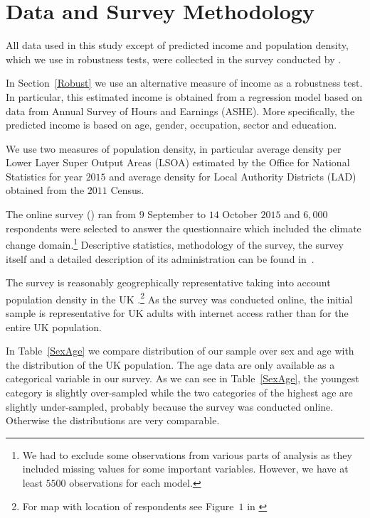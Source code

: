 \documentclass[a4paper,12pt]{article}
\begin{document}
\FloatBarrier
\section{Data and Survey Methodology}\label{Data}
All data used in this study except of predicted income and population density, which we use in robustness tests,  were collected in the survey conducted by \cite{SurveyUK}. 



In Section~\ref{Robust} we use an alternative measure of income as a robustness test. In particular, this estimated income is obtained from a regression model based on data from Annual Survey of Hours and Earnings (ASHE). More specifically, the predicted income is based on age, gender, occupation, sector and education.


We use two measures of population density, in particular average density per Lower Layer Super Output Areas (LSOA) estimated by the Office for National Statistics for year $2015$ and average density for Local Authority Districts (LAD) obtained from the $2011$ Census.




The online survey (\citealp{SurveyUK}) ran from $9$ September to $14$
October $2015$ and $6,000$ respondents were selected to answer the questionnaire which included the climate change domain.\footnote{We had to exclude some observations from various parts of analysis as they included missing values for some important variables. However, we have at least $5500$ observations for each model.} Descriptive statistics, methodology of the survey, the survey itself and a detailed description of its administration can be found in~\citet{SurveyUK}. 

The survey is reasonably geogrephically representative taking into account population density in the UK \citep{SurveyUK}.\footnote{For map with location of respondents see Figure~$1$ in \cite{SurveyUK}} As the survey was conducted online, the initial sample is representative for UK adults with internet access rather than for the entire UK population. 


In Table~\ref{SexAge} we compare distribution of our sample over sex and age  with the distribution of the UK population. The age data are only available as a categorical variable in our survey. As we can see in Table~\ref{SexAge}, the youngest category is slightly over-sampled while the two categories of the highest age are slightly under-sampled, probably because the survey was conducted online. Otherwise the distributions are very comparable.
\end{document}
